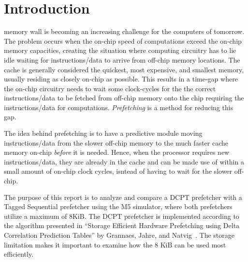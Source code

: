 \section{Introduction}

 memory wall is becoming an increasing challenge for the
computers of tomorrow. The problem occurs when the on-chip speed of computations
exceed the on-chip memory capacities, creating the situation where computing
circuitry has to lie idle waiting for instructions/data to arrive from off-chip
memory locations. The cache is generally considered the quickest, most
expensive, and smallest memory, usually residing as closely on-chip as possible.
This results in a time-gap where the on-chip circuitry needs to wait some
clock-cycles for the the correct instructions/data to be fetched from off-chip
memory onto the chip requiring the instructions/data for computations.
\emph{Prefetching} is a method for reducing this gap.

The idea behind prefetching is to have a predictive module moving
instructions/data from the slower off-chip memory to the much faster cache
memory on-chip \emph{before} it is needed. Hence, when the processor requires
new instructions/data, they are already in the cache and can be made use of
within a small amount of on-chip clock cycles, isntead of having to wait for the
slower off-chip.

The purpose of this report is to analyze and compare a DCPT prefetcher with a
Tagged Sequential prefetcher using the M5 simulator, where both prefetchers
utilize a maximum of 8KiB. The DCPT prefetcher is implemented according to the
algorithm presented in ``Storage Efficient Hardware Prefetching using Delta
Correlation Prediction Tables'' by Grannaes, Jahre, and Natvig~\cite{dcpt}. The
storage limitation makes it important to examine how the 8 KiB can be used most
efficiently.


